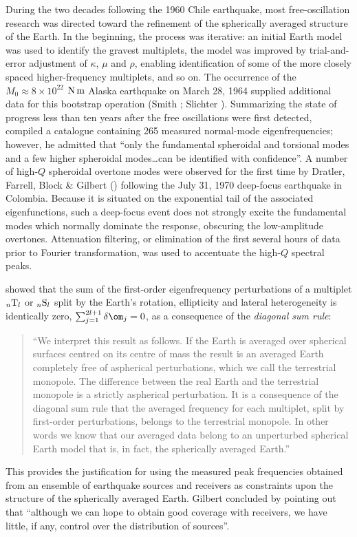During the two decades following the 1960 Chile earthquake,
most free-oscillation research was directed toward the
refinement of the spherically averaged structure of the
Earth.  In the beginning, the process was iterative: an
initial Earth model was used to identify the gravest
multiplets, the model was improved by trial-and-error
adjustment of $\kappa$, $\mu$ and $\rho$, enabling
identification of some of the more closely spaced
higher-frequency multiplets, and so on.
The occurrence of the $M_0\approx 8\times 10^{22}$ ${\rm N}\,{\rm m}$
Alaska earthquake
%
on March 28, 1964 supplied additional
data for this bootstrap operation (Smith \citeyear{smith66};
Slichter \citeyear{slichter67}).
Summarizing the state of progress less than ten years
after the free oscillations were first detected,
\textcite{derr69} compiled a catalogue containing
265 measured normal-mode eigenfrequencies; however,
he admitted that ``only the fundamental spheroidal
and torsional modes and a few higher spheroidal
modes\ldots can be identified with confidence''.
A number of high-$Q$ spheroidal overtone modes
were observed for the first time by Dratler, Farrell,
Block \& Gilbert (\citeyear{dratler&al71}) following
the July 31, 1970 deep-focus earthquake in Colombia.
%
Because it is situated on the exponential tail of
the associated eigenfunctions, such a deep-focus event
does not strongly excite the fundamental modes which normally
dominate the response, obscuring the low-amplitude overtones.
Attenuation filtering,
%
or elimination of the first several
hours of data prior to Fourier transformation, was used to
accentuate the high-$Q$ spectral peaks.

\textcite{gilbert71a} showed that the sum
of the first-order eigenfrequency perturbations
of a multiplet ${}_n{\rm T}_l$ or ${}_n{\rm S}_l$ split by
the Earth's rotation, ellipticity and lateral heterogeneity
is identically zero, $\sum_{j=1}^{2l+1}\delta\om_j=0$,
as a consequence of the {\em diagonal sum rule\/}:
%
\begin{quote}
``We interpret this result as follows.  If the Earth
is averaged over spherical surfaces centred on its centre
of mass the result is an averaged Earth completely free
of aspherical perturbations, which we call the terrestrial
%
monopole.  The difference between the real Earth and the
terrestrial monopole is a strictly aspherical perturbation.
It is a consequence of the diagonal sum rule that the averaged
%
frequency for each multiplet, split by first-order perturbations,
belongs to the terrestrial monopole.  In other words we know that
our averaged data belong to an unperturbed spherical Earth model
that is, in fact, the spherically averaged Earth.''
\end{quote}
This provides the justification for using the measured peak
frequencies obtained from an ensemble of earthquake sources
and receivers as constraints upon the structure of the
spherically averaged Earth.
Gilbert concluded by pointing out that ``although we can hope
to obtain good coverage with receivers, we have little, if any,
control over the distribution of sources''.

